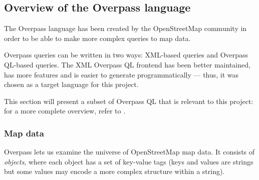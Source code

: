 \documentclass[main.tex]{subfiles}
\begin{document}
\subsection{Overview of the Overpass language}
The Overpass language \cite{overpass} has been created by the OpenStreetMap
community in order to be able to make more complex queries to map data.

Overpass queries can be written in two ways: XML-based queries and Overpass QL-based
queries. The XML Overpass QL frontend has been better maintained, has more features
and is easier to generate programmatically --- thus, it was chosen as a target
language for this project.

This section will present a subset of Overpass QL that is relevant to this project: for a
more complete overview, refer to \cite{overpassql}.

\subsubsection{Map data}
Overpass lets us examine the universe of OpenStreetMap map data.
It consists of \emph{objects}, where each object has a set of key-value
tags (keys and values are strings but some values may encode a more complex
structure within a string).
\end{document}
